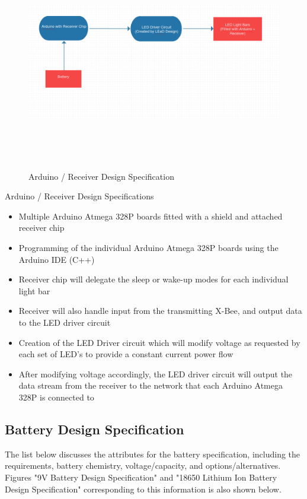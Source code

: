 \documentclass[12pt]{article}
\begin{document}
	\begin{figure}[!htb]
		\centering
		\includegraphics[width = 140mm, height = 95mm]{assets/Arduino_Receiver_Diagram.png}
		\caption{Arduino / Receiver Design Specification \label{overflow}}
	\end{figure}
	
	\indent
	Arduino / Receiver Design Specifications
	\begin{itemize}
		\item Multiple Arduino Atmega 328P boards fitted with a shield and   						  attached receiver chip 
		\item Programming of the individual Arduino Atmega 328P boards using the 					  Arduino IDE (C++)
		\item Receiver chip will delegate the sleep or wake-up modes for each 					  individual light bar
		\item Receiver will also handle input from the transmitting X-Bee, and output 			  data to the LED driver circuit
		\item Creation of the LED Driver circuit which will modify voltage as 						  requested by each set of LED’s to provide a constant current power flow
		\item After modifying voltage accordingly, the LED driver circuit will output 			  the data stream from the receiver to the network that each Arduino 					  Atmega 328P is connected to
	\end{itemize}

	\subsection{Battery Design Specification}
	The list below discusses the attributes for the battery specification, including the requirements, battery chemistry, voltage/capacity, and options/alternatives. Figures "9V Battery Design Specification" and "18650 Lithium Ion Battery Design Specification" corresponding to this information is also shown below.
	
\end{document}
